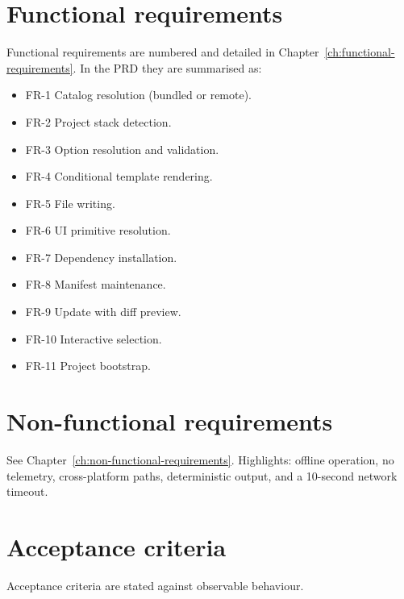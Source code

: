 \section{Functional requirements}

Functional requirements are numbered and detailed in
Chapter~\ref{ch:functional-requirements}. In the PRD they are summarised as:

\begin{itemize}
  \item FR-1 Catalog resolution (bundled or remote).
  \item FR-2 Project stack detection.
  \item FR-3 Option resolution and validation.
  \item FR-4 Conditional template rendering.
  \item FR-5 File writing.
  \item FR-6 UI primitive resolution.
  \item FR-7 Dependency installation.
  \item FR-8 Manifest maintenance.
  \item FR-9 Update with diff preview.
  \item FR-10 Interactive selection.
  \item FR-11 Project bootstrap.
\end{itemize}

\section{Non-functional requirements}

See Chapter~\ref{ch:non-functional-requirements}. Highlights: offline operation,
no telemetry, cross-platform paths, deterministic output, and a 10-second network
timeout.

\section{Acceptance criteria}

Acceptance criteria are stated against observable behaviour.

